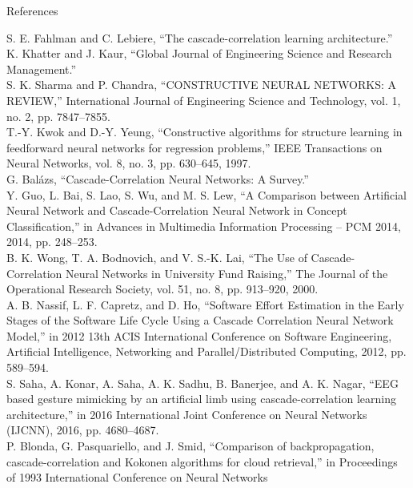 \documentclass{beamer}
\begin{document}
\begin{frame}[allowframebreaks, t]{References}
  \tiny
  \begin{thebibliography}{99}
    \bibitem[]{} S. E. Fahlman and C. Lebiere, “The cascade-correlation learning 
    architecture.” \\
    \bibitem{} K. Khatter and J. Kaur, “Global Journal of Engineering Science and
    Research Management.” \\
    \bibitem{} S. K. Sharma and P. Chandra, “CONSTRUCTIVE NEURAL NETWORKS: A REVIEW,”
    International Journal of Engineering Science and Technology, vol. 1, no. 2,
    pp. 7847–7855. \\
    \bibitem{} T.-Y. Kwok and D.-Y. Yeung, “Constructive algorithms for structure
    learning in feedforward neural networks for regression problems,” IEEE
    Transactions on Neural Networks, vol. 8, no. 3, pp. 630–645, 1997. \\
    \bibitem{} G. Balázs, “Cascade-Correlation Neural Networks: A Survey.” \\
    \bibitem{} Y. Guo, L. Bai, S. Lao, S. Wu, and M. S. Lew, “A Comparison between
    Artificial Neural Network and Cascade-Correlation Neural Network in Concept
    Classification,” in Advances in Multimedia Information Processing – PCM
    2014, 2014, pp. 248–253. \\ 
    \bibitem{} B. K. Wong, T. A. Bodnovich, and V. S.-K. Lai, “The Use of
    Cascade-Correlation Neural Networks in University Fund Raising,” The Journal
    of the Operational Research Society, vol. 51, no. 8, pp. 913–920, 2000. \\
    \bibitem{} A. B. Nassif, L. F. Capretz, and D. Ho, “Software Effort Estimation in
    the Early Stages of the Software Life Cycle Using a Cascade Correlation
    Neural Network Model,” in 2012 13th ACIS International Conference on
    Software Engineering, Artificial Intelligence, Networking and
    Parallel/Distributed Computing, 2012, pp. 589–594. \\
    \bibitem{} S. Saha, A. Konar, A. Saha, A. K. Sadhu, B. Banerjee, and A. K. Nagar,
    “EEG based gesture mimicking by an artificial limb using cascade-correlation
    learning architecture,” in 2016 International Joint Conference on Neural
    Networks (IJCNN), 2016, pp. 4680–4687. \\
    \bibitem{} P. Blonda, G. Pasquariello, and J. Smid, “Comparison of backpropagation,
    cascade-correlation and Kokonen algorithms for cloud retrieval,” in
    Proceedings of 1993 International Conference on Neural Networks

\end{thebibliography}
\end{frame}
\end{document}
